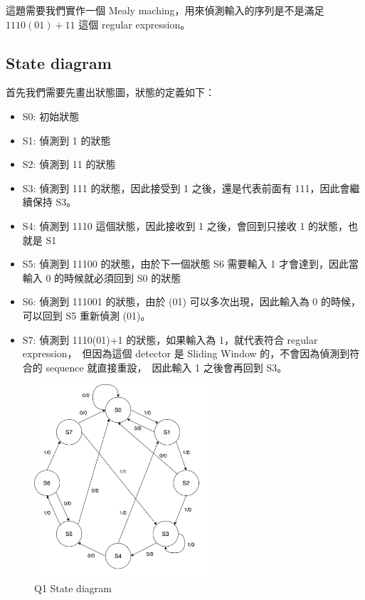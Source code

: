 \documentclass[10.5pt,compsoc,UTF8]{CjC}
\theoremstyle{mystyle}
\begin{document}
這題需要我們實作一個 Mealy maching，用來偵測輸入的序列是不是滿足 $1110(01)+11$ 這個 regular expression。

\subsection{State diagram}

首先我們需要先畫出狀態圖，狀態的定義如下：
\begin{itemize}
  \item S0: 初始狀態
  \item S1: 偵測到 1 的狀態
  \item S2: 偵測到 11 的狀態
  \item S3: 偵測到 111 的狀態，因此接受到 1 之後，還是代表前面有 111，因此會繼續保持 S3。
  \item S4: 偵測到 1110 這個狀態，因此接收到 1 之後，會回到只接收 1 的狀態，也就是 S1
  \item S5: 偵測到 11100 的狀態，由於下一個狀態 S6 需要輸入 1 才會達到，因此當輸入 0 的時候就必須回到 S0 的狀態
  \item S6: 偵測到 111001 的狀態，由於 (01) 可以多次出現，因此輸入為 0 的時候，可以回到 S5 重新偵測 (01)。
  \item S7: 偵測到 1110(01)+1 的狀態，如果輸入為 1，就代表符合 regular expression，\
            但因為這個 detector 是 Sliding Window 的，不會因為偵測到符合的 sequence 就直接重設，\
            因此輸入 1 之後會再回到 S3。
\end{itemize}

\newpage

\begin{figure}[h!]
  \centering
  \includegraphics[width=0.6\textwidth]{./img/Q1-state.png}
  \caption{Q1 State diagram}
  \label{fig:Q1-state}
\end{figure}
\end{document}
